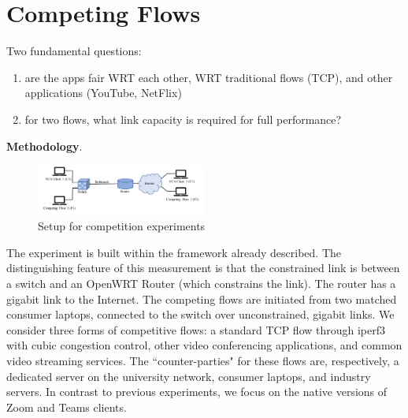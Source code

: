 \section{Competing Flows}
Two fundamental questions:
\begin{enumerate}
    \item are the apps fair WRT each other, WRT traditional flows (TCP), and other applications (YouTube, NetFlix)
    \item for two flows, what link capacity is required for full performance?
\end{enumerate}


\noindent \textbf{Methodology}.
\begin{center}
   \begin{figure}[]
    \includegraphics[width=0.5\textwidth,keepaspectratio]{../figures/methodology/competition-setup.pdf}
    \caption{Setup for competition experiments
    }
    \label{fig:loss_latency}
\end{figure}
 
\end{center}

The experiment is built within the framework already described.
The distinguishing feature of this measurement is that the 
  constrained link is between a switch and an OpenWRT Router 
    (which constrains the link).
The router has a gigabit link to the Internet.
The competing flows are initiated from two matched consumer laptops,
  connected to the switch over unconstrained, gigabit links.
We consider three forms of competitive flows:
  a standard TCP flow through iperf3 with cubic congestion control,
  other video conferencing applications, and 
  common video streaming services.
The ``counter-parties" for these flows are, respectively,
  a dedicated server on the university network,
  consumer laptops, and industry servers.
In contrast to previous experiments, 
  we focus on the native versions of Zoom and Teams clients.

